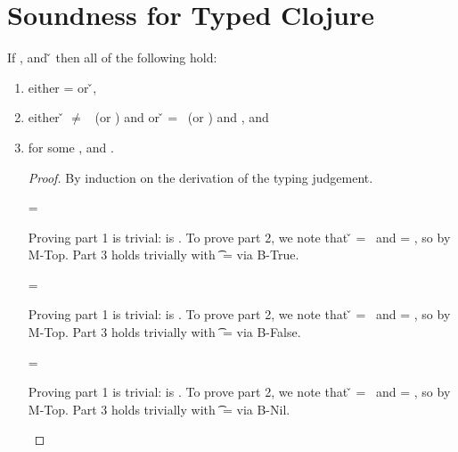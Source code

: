 \section{Soundness for Typed Clojure}

\begin{lemma}
If \judgement{\propenv{}}{\hastype{\e{}}{\t{}}}{\filterset{\thenprop{\prop{}}}{\elseprop{\prop{}}}}{\object{}},
\satisfies{\openv{}}{\propenv{}} and \opsem {\openv{}} {\e{}} {\v{}} then all of the following hold:
\begin{enumerate}
  \item either \object{} = \emptyobject{} or \inopenv {\openv{}} {\object{}} {\v{}},
  \item either \v{} $\not=$ \false\ (or \nil) and {\satisfies{\openv{}}{\thenprop{\prop{}}}} or 
               \v{}     = \false\ (or \nil) and {\satisfies{\openv{}}{\elseprop{\prop{}}}}, and
  \item \judgement{}{\hastype{\v{}}{\t{}}}{\filterset{\thenprop{\propp{}}}{\elseprop{\propp{}}}}{\objectp{}}
        for some \thenprop{\propp{}}, \elseprop{\propp{}} and {\objectp{}}.

\begin{proof}
By induction on the derivation of the typing judgement.

\begin{case}[T-True]
\e{} = \true

Proving part 1 is trivial: \object{} is \emptyobject. To prove part 2, we note that \v{} = \true\ 
and \thenprop{\prop{}} = \topprop{}, so \satisfies{\openv{}}{\thenprop{\prop{}}} by M-Top. Part 3 
holds trivially with \t{} = \True via B-True.

\end{case}

\begin{case}[T-False]
\e{} = \false

Proving part 1 is trivial: \object{} is \emptyobject. To prove part 2, we note that \v{} = \false\ 
and \elseprop{\prop{}} = \topprop{}, so \satisfies{\openv{}}{\elseprop{\prop{}}} by M-Top. Part 3 
holds trivially with \t{} = \False via B-False.

\end{case}

\begin{case}[T-Nil]
\e{} = \nil

Proving part 1 is trivial: \object{} is \emptyobject. To prove part 2, we note that \v{} = \nil\ 
and \elseprop{\prop{}} = \topprop{}, so \satisfies{\openv{}}{\elseprop{\prop{}}} by M-Top. Part 3 
holds trivially with \t{} = \Nil via B-Nil.


\end{case}
\end{proof}
\end{enumerate}
\end{lemma}
